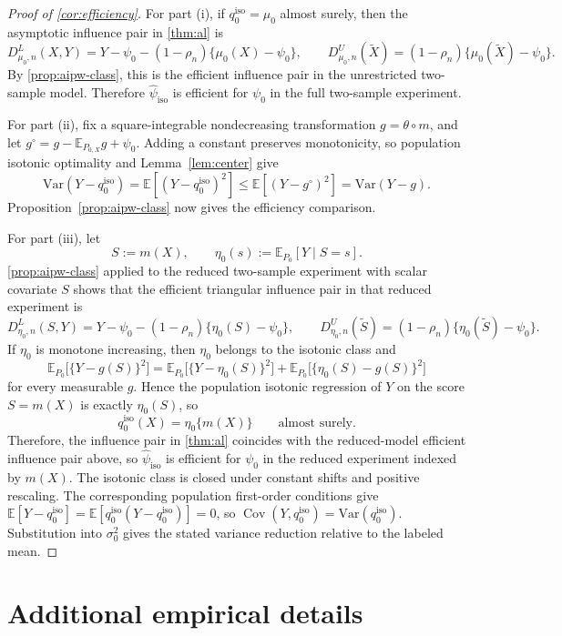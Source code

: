 \documentclass{article}
\theoremstyle{plain}
\theoremstyle{definition}
\newcommand{\E}{\mathbb{E}}
\newcommand{\Var}{\mathrm{Var}}
\newcommand{\1}{\mathbf{1}}
\newcommand{\mhat}{m}
\newcommand{\rhon}{\rho_n}
\newcommand{\muzero}{\mu_0}
\newcommand{\Px}{P_{0,X}}
\newcommand{\Cov}{\operatorname{Cov}}
\begin{document}
\begin{proof}[Proof of \cref{cor:efficiency}]
For part (i), if \(q_0^{\mathrm{iso}}=\muzero\) almost surely, then the asymptotic influence pair in \cref{thm:al} is
\[
D_{\mu_0,n}^L(X,Y)
=
Y-\psi_0-(1-\rhon)\{\mu_0(X)-\psi_0\},
\qquad
D_{\mu_0,n}^U(\widetilde X)
=
(1-\rhon)\{\mu_0(\widetilde X)-\psi_0\}.
\]
By \cref{prop:aipw-class}, this is the efficient influence pair in the unrestricted two-sample model. Therefore \(\widehat{\psi}_{\mathrm{iso}}\) is efficient for \(\psi_0\) in the full two-sample experiment.

For part (ii), fix a square-integrable nondecreasing transformation
\(g=\theta\circ\mhat\), and let \(g^\circ=g-\E_{\Px}g+\psi_0\).
Adding a constant preserves monotonicity, so population isotonic optimality
and Lemma~\ref{lem:center} give
\[
\Var(Y-q_0^{\mathrm{iso}})=\E[(Y-q_0^{\mathrm{iso}})^2]
\le\E[(Y-g^\circ)^2]=\Var(Y-g).
\]
Proposition~\ref{prop:aipw-class} now gives the efficiency comparison.

For part (iii), let
\[
S:=\mhat(X),
\qquad
\eta_0(s):=\E_{P_0}[Y\mid S=s].
\]
\cref{prop:aipw-class} applied to the reduced two-sample experiment with scalar covariate \(S\) shows that the efficient triangular influence pair in that reduced experiment is
\[
D_{\eta_0,n}^L(S,Y)
=
Y-\psi_0-(1-\rhon)\{\eta_0(S)-\psi_0\},
\qquad
D_{\eta_0,n}^U(\widetilde S)
=
(1-\rhon)\{\eta_0(\widetilde S)-\psi_0\}.
\]
If \(\eta_0\) is monotone increasing, then \(\eta_0\) belongs to the isotonic class and
\[
\E_{P_0}\bigl[\{Y-g(S)\}^2\bigr]
=
\E_{P_0}\bigl[\{Y-\eta_0(S)\}^2\bigr]
+
\E_{P_0}\bigl[\{\eta_0(S)-g(S)\}^2\bigr]
\]
for every measurable \(g\). Hence the population isotonic regression of \(Y\) on the score \(S=\mhat(X)\) is exactly \(\eta_0(S)\), so
\[
q_0^{\mathrm{iso}}(X)=\eta_0\{\mhat(X)\}
\qquad\text{almost surely.}
\]
Therefore, the influence pair in \cref{thm:al} coincides with the reduced-model efficient influence pair above, so \(\widehat{\psi}_{\mathrm{iso}}\) is efficient for \(\psi_0\) in the reduced experiment indexed by \(\mhat(X)\).
The isotonic class is closed under constant shifts and positive rescaling.
The corresponding population first-order conditions give
\(\E[Y-q_0^{\mathrm{iso}}]=\E[q_0^{\mathrm{iso}}(Y-q_0^{\mathrm{iso}})]=0\), so
\(\Cov(Y,q_0^{\mathrm{iso}})=\Var(q_0^{\mathrm{iso}})\).
Substitution into \(\sigma_0^2\) gives the stated variance reduction relative
to the labeled mean.
\end{proof}

\section{Additional empirical details}
\label{app:empirical}
\end{document}
